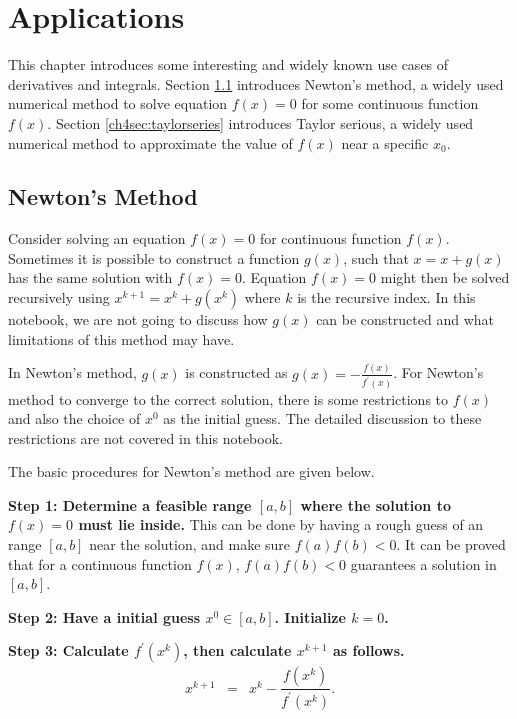 \chapter{Applications}

This chapter introduces some interesting and widely known use cases of derivatives and integrals. Section \ref{ch4sec:newtonsmethod} introduces Newton's method, a widely used numerical method to solve equation $f(x) = 0$ for some continuous function $f(x)$. Section \ref{ch4sec:taylorseries} introduces Taylor serious, a widely used numerical method to approximate the value of $f(x)$ near a specific $x_0$.

\section{Newton's Method} \label{ch4sec:newtonsmethod}

Consider solving an equation $f(x)=0$ for continuous function $f(x)$. Sometimes it is possible to construct a function $g(x)$, such that $x= x + g(x)$ has the same solution with $f(x) = 0$. Equation $f(x)=0$ might then be solved recursively using $x^{k+1} = x^k + g(x^k)$ where $k$ is the recursive index. In this notebook, we are not going to discuss how $g(x)$ can be constructed and what limitations of this method may have.

In Newton's method, $g(x)$ is constructed as $g(x) = -\frac{f(x)}{f^\prime(x)}$. For Newton's method to converge to the correct solution, there is some restrictions to $f(x)$ and also the choice of $x^0$ as the initial guess. The detailed discussion to these restrictions are not covered in this notebook.

The basic procedures for Newton's method are given below.

\textbf{Step 1: Determine a feasible range $[a, b]$ where the solution to $f(x)=0$ must lie inside.} This can be done by having a rough guess of an range $[a, b]$ near the solution, and make sure $f(a)f(b)<0$. It can be proved that for a continuous function $f(x)$, $f(a)f(b)<0$ guarantees a solution in $[a, b]$.

\textbf{Step 2: Have a initial guess $x^0 \in [a, b]$. Initialize $k=0$.}

\textbf{Step 3: Calculate $f^\prime(x^k)$, then calculate $x^{k+1}$ as follows.}
\begin{eqnarray}
    x^{k+1} &=& x^k - \dfrac{f(x^k)}{f^\prime(x^k)}. \nonumber
\end{eqnarray}

